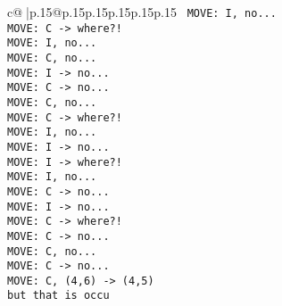 \documentclass{article}
\begin{document}
{\begin{supertabular}{c@{$\;$}|p{.15\linewidth}@{}p{.15\linewidth}p{.15\linewidth}p{.15\linewidth}p{.15\linewidth}p{.15\linewidth}}
{{{\ \tt  MOVE: I, no...\\ \tt  MOVE: C -> where?!\\ \tt  MOVE: I, no...\\ \tt  MOVE: C, no...\\ \tt  MOVE: I -> no...\\ \tt  MOVE: C -> no...\\ \tt  MOVE: C, no...\\ \tt  MOVE: C -> where?!\\ \tt  MOVE: I, no...\\ \tt  MOVE: I -> no...\\ \tt  MOVE: I -> where?!\\ \tt  MOVE: I, no...\\ \tt  MOVE: C -> no...\\ \tt  MOVE: I -> no...\\ \tt  MOVE: C -> where?!\\ \tt  MOVE: C -> no...\\ \tt  MOVE: C, no...\\ \tt  MOVE: C -> no...\\ \tt  MOVE: C, (4,6) -> (4,5) \\ \tt  but that is occu}}}
\end{supertabular}}
\end{document}
